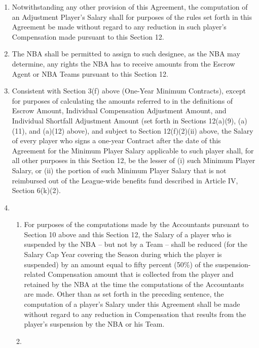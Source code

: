 \documentclass[
]{book}
\providecommand{\tightlist}{%
  \setlength{\itemsep}{0pt}\setlength{\parskip}{0pt}}
\begin{document}
\begin{enumerate}
  \begin{enumerate}
  \def\labelenumii{(\arabic{enumii})}
  \item
    Notwithstanding any other provision of this Agreement, the computation of an Adjustment Player's Salary shall for purposes of the rules set forth in this Agreement be made without regard to any reduction in such player's Compensation made pursuant to this Section 12.
  \item
    The NBA shall be permitted to assign to such designee, as the NBA may determine, any rights the NBA has to receive amounts from the Escrow Agent or NBA Teams pursuant to this Section 12.
  \item
    Consistent with Section 3(f) above (One-Year Minimum Contracts), except for purposes of calculating the amounts referred to in the definitions of Escrow Amount, Individual Compensation Adjustment Amount, and Individual Shortfall Adjustment Amount (set forth in Sections 12(a)(9), (a)(11), and (a)(12) above), and subject to Section 12(f)(2)(ii) above, the Salary of every player who signs a one-year Contract after the date of this Agreement for the Minimum Player Salary applicable to such player shall, for all other purposes in this Section 12, be the lesser of (i) such Minimum Player Salary, or (ii) the portion of such Minimum Player Salary that is not reimbursed out of the League-wide benefits fund described in Article IV, Section 6(k)(2).
  \item
    \begin{enumerate}
    \def\labelenumiii{(\roman{enumiii})}
    \tightlist
    \item
      For purposes of the computations made by the Accountants pursuant to Section 10 above and this Section 12, the Salary of a player who is suspended by the NBA -- but not by a Team -- shall be reduced (for the Salary Cap Year covering the Season during which the player is suspended) by an amount equal to fifty percent (50\%) of the suspension-related Compensation amount that is collected from the player and retained by the NBA at the time the computations of the Accountants are made. Other than as set forth in the preceding sentence, the computation of a player's Salary under this Agreement shall be made without regard to any reduction in Compensation that results from the player's suspension by the NBA or his Team.
    \item

\end{enumerate}
\end{enumerate}
\end{enumerate}
\end{document}
